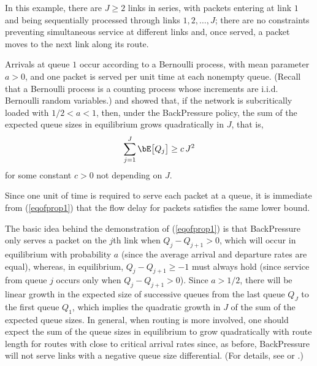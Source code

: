 \documentclass{amsart}
\newtheorem{proposition}{Proposition}
\begin{document}
In this example, there are $J\ge 2$ links in series, with packets entering at link $1$ and being sequentially processed through links $1,2,\ldots,J$;
there are no constraints preventing simultaneous service at different links and,
once served, a packet moves to the next link along its route.
\iffalse
We assume there is a maximum number of allowed failures at a given link, say $\bar q$.\footnote{We remark that, in this setting, we can define BackPressure policy with the probability $1-q_j$ in expression \eqref{BPOpt}. 
Further, with the assumed technical condition, the probabilistic routing in this example is a special case of the routing structure considered in this paper for the proportionally scheduler.}
\fi
Arrivals at queue $1$ occur according to a Bernoulli process, with mean parameter $a>0$, and one packet is served per unit time at each nonempty queue. (Recall that a Bernoulli process is a counting process whose increments are i.i.d. Bernoulli random variables.)
\cite{BSS11} and  \cite{St11} showed that,
 if the network is subcritically loaded with $1/2 <a<1$,  then, under the BackPressure policy,
 the sum of the expected queue sizes in equilibrium grows quadratically in $J$, that is,
\begin{equation}
\label{eqofprop1}
\sum_{j=1}^J \bE \big[ Q_{j} \big] \geq  c \, J^2 
\end{equation}
for some constant $c>0$ not depending on $J$.
\iffalse
\begin{proposition}\label{pr:linear.network.BP}
In a linear network with $J\ge 2$ links, if the network is subcritically loaded and $\alpha_j > 1/2$ for all $j$, then, under the BackPressure policy,
 the sum of the expected queue sizes in equilibrium grows quadratically in $J$; in particular,
\begin{equation}
\label{eqofprop1}
\sum_{j=1}^J \bE \big[ Q_{j} \big] \geq  c \, J^2 
\end{equation}
for some constant $c>0$ not depending on $J$.
\end{proposition}
\fi
Since one unit of time is required to serve each packet at a queue, it is immediate from (\ref{eqofprop1}) that the flow delay for packets satisfies the same lower bound.

The basic idea behind the demonstration of (\ref{eqofprop1}) is that 
BackPressure only serves a packet on the $j$th link when $Q_j  - Q_{j+1} > 0$, which will occur in equilibrium with probability $a$ (since the average arrival and departure rates are equal), whereas, in equilibrium, $Q_j  - Q_{j+1} \ge -1$ must always hold (since service from queue $j$ occurs only when $Q_j - Q_{j+1} > 0$).  Since $a > 1/2$, there will be linear growth in the expected size of successive queues from the last queue $Q_J$ to the first queue $Q_1$, which
implies the quadratic growth in $J$ of the sum of the expected queue sizes.
In general, when routing is more involved,
one should expect the sum of the queue sizes in equilibrium to grow quadratically with route length for routes with close to critical arrival rates since, as before,  
BackPressure will not serve links with a negative queue size differential.
(For details, see \cite{BSS11} or \cite{St11}.)
\end{document}
